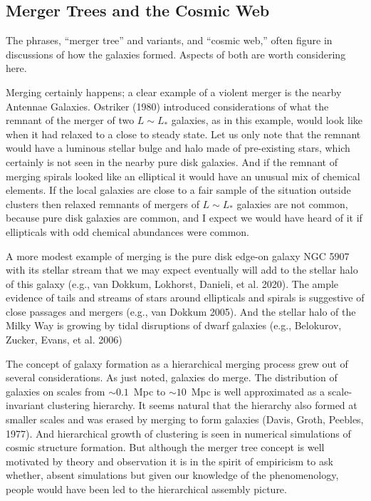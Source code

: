 \documentclass[fleqn,12pt]{article}
\begin{document}
\subsection{Merger Trees and the Cosmic Web}

The phrases, ``merger tree'' and variants, and ``cosmic web,'' often figure in discussions of how the galaxies formed. Aspects of both are worth considering here. 

Merging certainly happens; a clear example of a violent merger is the nearby Antennae Galaxies. Ostriker (1980) introduced considerations of what the remnant of the merger of two $L\sim L_\ast$ galaxies, as in this example, would look like when it had relaxed to a close to steady state. Let us only note that the remnant would have a luminous stellar bulge and halo made of pre-existing stars, which certainly is not seen in the nearby pure disk galaxies. And if the remnant of merging spirals looked like an elliptical it would have an unusual mix of chemical elements. If the local galaxies are close to a fair sample of the situation outside clusters then relaxed remnants of mergers of $L\sim L_\ast$ galaxies are not common, because pure disk galaxies are common, and I expect we would have heard of it if ellipticals with odd chemical abundances were common. 

A more modest example of merging is the pure disk edge-on galaxy NGC 5907 with its stellar stream that we may expect  eventually will add to the stellar halo of this galaxy (e.g., van Dokkum, Lokhorst, Danieli, et al. 2020). The ample evidence of tails and streams of stars around ellipticals and spirals is suggestive of close passages and mergers (e.g., van Dokkum 2005). And the stellar halo of the Milky Way is growing by tidal disruptions of dwarf galaxies (e.g., Belokurov, Zucker, Evans, et al. 2006)

The concept of galaxy formation as a hierarchical merging process grew out of several considerations. As just noted, galaxies do merge. The distribution of galaxies on scales from $\sim 0.1$~Mpc to $\sim 10$~Mpc is well approximated as a scale-invariant clustering hierarchy. It seems natural that the hierarchy also formed at smaller scales and was erased by merging to form galaxies (Davis, Groth, Peebles, 1977). And hierarchical growth of clustering is seen in numerical simulations of cosmic structure formation. But although the merger tree concept is well motivated by theory and observation it is in the spirit of empiricism to ask whether, absent simulations but given our knowledge of the phenomenology, people would have been led to the hierarchical assembly picture. 
\end{document}
